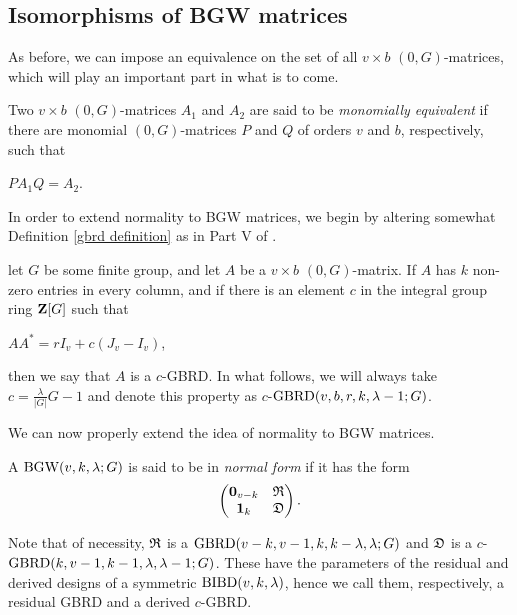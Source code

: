 \documentclass[../../../main]{subfiles}
\begin{document}
\dinkus


\subsection{Isomorphisms of BGW matrices}

As before, we can impose an equivalence on the set of all $v \times b$ $(0,G)$-matrices, which will play an important part in what is to come. 

\begin{defin}\label{monomial-equiv}
  Two $v \times b$ $(0,G)$-matrices $A_1$ and $A_2$ are said to be {\it monomially equivalent} if there are monomial $(0,G)$-matrices $P$ and $Q$ of orders $v$ and $b$, respectively, such that 
  \begin{defenum}
  \item $PA_1Q=A_2$.
  \end{defenum}
\end{defin}

 In order to extend normality to BGW matrices, we begin by altering somewhat Definition \ref{gbrd definition} as in Part V of \cite{handbook}.
 
 \begin{defin}\label{c-gbrd defintion}
   let $G$ be some finite group, and let $A$ be a $v \times b$ $(0,G)$-matrix.
   If $A$ has $k$ non-zero entries in every column, and if there is an element
   $c$ in the integral group ring $\mathbf{Z}[G]$ such that 
  \begin{defenum}
   \item\label{c-gbrd-eq} $AA^* = rI_v + c(J_v - I_v)$,
  \end{defenum}
  then we say that $A$ is a $c$-GBRD. In what follows, we will always take $c
  = \frac{\lambda}{|G|}G - 1$ and denote this property as
  $c$-$\text{GBRD}(v,b,r,k,\lambda-1;G)$. 
 \end{defin}
 
 We can now properly extend the idea of normality to BGW matrices.
 
 \begin{defin}
   A $\text{BGW}(v,k,\lambda;G)$ is said to be in {\it normal form} if it has the form
   \begin{equation}
     \begin{pmatrix}
       \mathbf{0}_{v-k} & \mathfrak{R} \\ \mathbf{1}_{k} & \mathfrak{D}
     \end{pmatrix}.
   \end{equation}
   
   Note that of necessity, $\mathfrak{R}$ is a $\text{GBRD}(v-k,v-1,k,k-\lambda,\lambda;G)$
   and $\mathfrak{D}$ is a $c$-$\text{GBRD}(k,v-1,k-1,\lambda,\lambda-1;G)$. These have the
   parameters of the residual and derived designs of a symmetric
   $\text{BIBD}(v,k,\lambda)$, hence we call them, respectively, a residual GBRD and a
   derived $c$-GBRD. 
 \end{defin}
\end{document}
